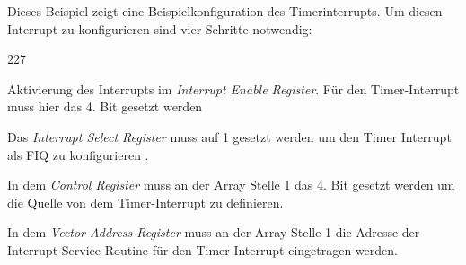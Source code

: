 \noindent
Dieses Beispiel zeigt eine Beispielkonfiguration des Timerinterrupts. Um diesen Interrupt zu konfigurieren sind vier Schritte notwendig:
\begin{dinglist}{227}
	\item{Aktivierung des Interrupts im \textit{Interrupt Enable Register}. F\"ur den Timer-Interrupt muss hier das 4. Bit gesetzt werden \parencite[vgl.  Tabelle 4-40][227]{archManI}}
	\item{Das \textit{Interrupt Select Register} muss auf 1 gesetzt werden um den Timer Interrupt als FIQ zu konfigurieren \parencite[vgl Tabelle 3-5][39]{vic}.}
	\item{In dem \textit{Control Register} muss an der Array Stelle 1 das 4. Bit gesetzt werden um die Quelle von dem Timer-Interrupt zu definieren.}
	\item{In dem \textit{Vector Address Register} muss an der Array Stelle 1 die Adresse der Interrupt Service Routine f\"ur den Timer-Interrupt eingetragen werden.}
\end{dinglist}


